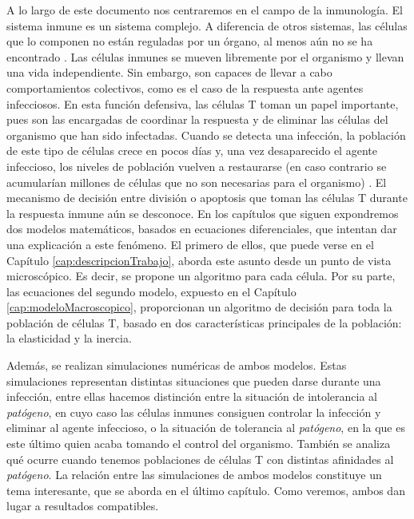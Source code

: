 A lo largo de este documento nos centraremos en el campo de la inmunología. El sistema inmune es un sistema complejo. A diferencia de otros sistemas, las células que lo componen no están reguladas por un órgano, al menos aún no se ha encontrado \citep{arias2016emergent}. Las células inmunes se mueven libremente por el organismo y llevan una vida independiente. Sin embargo, son capaces de llevar a cabo comportamientos colectivos, como es el caso de la respuesta ante agentes infecciosos. En esta función defensiva, las células T toman un papel importante, pues son las encargadas de coordinar la respuesta y de eliminar las células del organismo que han sido infectadas. Cuando se detecta una infección, la población de este tipo de células crece en pocos días y, una vez desaparecido el agente infeccioso, los niveles de población vuelven a restaurarse (en caso contrario se acumularían millones de células que no son necesarias para el organismo) \citep{fernandez2012mecanica}. El mecanismo de decisión entre división o apoptosis que toman las células T durante la respuesta inmune aún se desconoce. En los capítulos que siguen expondremos dos modelos matemáticos, basados en ecuaciones diferenciales, que intentan dar una explicación a este fenómeno. El primero de ellos, que puede verse en el Capítulo \ref{cap:descripcionTrabajo}, aborda este asunto desde un punto de vista microscópico. Es decir, se propone un algoritmo para cada célula. Por su parte, las ecuaciones del segundo modelo, expuesto en el Capítulo \ref{cap:modeloMacroscopico}, proporcionan un algoritmo de decisión para toda la población de células T, basado en dos características principales de la población: la elasticidad y la inercia.

 

 
Además, se realizan simulaciones numéricas de ambos modelos. Estas simulaciones representan distintas situaciones que pueden darse durante una infección, entre ellas hacemos distinción entre la situación de intolerancia al \textit{patógeno}, en cuyo caso las células inmunes consiguen controlar la infección y eliminar al agente infeccioso, o la situación de tolerancia al \textit{patógeno}, en la que es este último quien acaba tomando el control del organismo. También se analiza qué ocurre cuando tenemos poblaciones de células T con distintas afinidades al \textit{patógeno}. La relación entre las simulaciones de ambos modelos constituye un tema interesante, que se aborda en el último capítulo. Como veremos, ambos dan lugar a resultados compatibles. 

